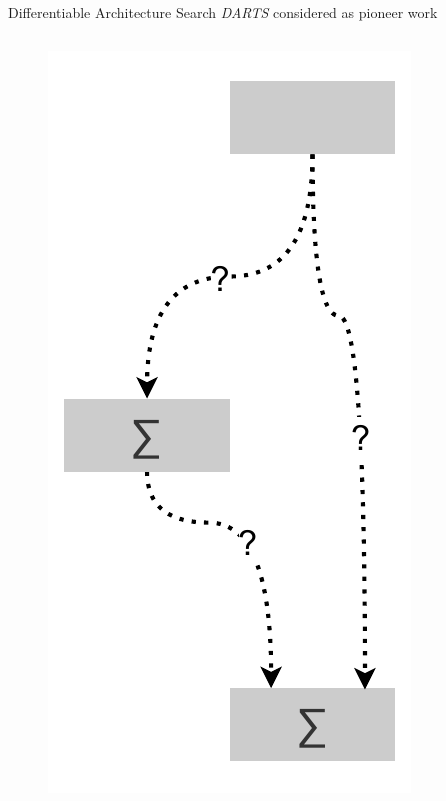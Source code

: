 \documentclass[]{beamer}
\begin{document}
\begin{frame}{Differentiable Architecture Search}
\vspace{10pt}
\textit{DARTS} \cite{Liu2018} considered as pioneer work
\vfill
\begin{columns}
\begin{column}{.35\textwidth}
\begin{figure}
	\includegraphics[scale=0.4, center]{graphics/darts_0.pdf}
\end{figure}
\end{column}
\begin{column}{.3\textwidth}
\end{column}
\begin{column}{.35\textwidth}
\end{column}
\end{columns}
\end{frame}
\end{document}

